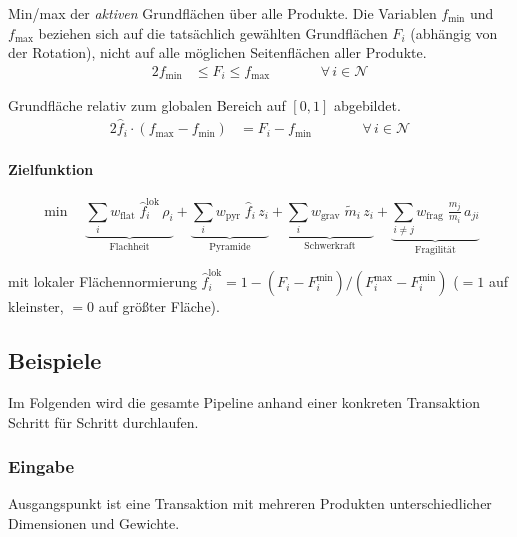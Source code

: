 \documentclass[10pt]{article}
\newcommand{\NN}{\mathcal{N}}
\begin{document}
Min/max der \emph{aktiven} Grundfl\"achen \"uber alle Produkte.
Die Variablen $f_{\min}$ und $f_{\max}$ beziehen sich auf die tats\"achlich
gew\"ahlten Grundfl\"achen $F_i$ (abh\"angig von der Rotation), nicht auf
alle m\"oglichen Seitenfl\"achen aller Produkte.
\begin{alignat*}{2}
f_{\min} &\leq F_i \leq f_{\max}
  &\qquad& \forall\, i \in \NN
\end{alignat*}

Grundfl\"ache relativ zum globalen Bereich auf $[0,1]$ abgebildet.
\begin{alignat*}{2}
\hat{f}_i \cdot (f_{\max} - f_{\min}) &= F_i - f_{\min}
  &\qquad& \forall\, i \in \NN
\end{alignat*}

\paragraph{Zielfunktion}

\begin{equation*}
\min \quad
  \underbrace{
    \sum_i w_{\mathrm{flat}}\; \hat{f}_i^{\mathrm{lok}}\, \rho_i
  }_{\text{Flachheit}}
  +
  \underbrace{
    \sum_i w_{\mathrm{pyr}}\; \hat{f}_i\, z_i
  }_{\text{Pyramide}}
  +
  \underbrace{
    \sum_i w_{\mathrm{grav}}\; \tilde{m}_i\, z_i
  }_{\text{Schwerkraft}}
  +
  \underbrace{
    \sum_{i \neq j}
    w_{\mathrm{frag}}\; \tfrac{m_j}{m_i}\, a_{ji}
  }_{\text{Fragilit\"at}}
\end{equation*}

mit lokaler Fl\"achennormierung
$\hat{f}_i^{\mathrm{lok}} = 1 - (F_i - F_i^{\min}) / (F_i^{\max} - F_i^{\min})$
\; ($= 1$ auf kleinster, $= 0$ auf gr\"o\ss ter Fl\"ache).

\subsection{Beispiele}

Im Folgenden wird die gesamte Pipeline anhand einer konkreten
Transaktion Schritt f\"ur Schritt durchlaufen.

\subsubsection{Eingabe}

Ausgangspunkt ist eine Transaktion mit mehreren Produkten
unterschiedlicher Dimensionen und Gewichte.
\end{document}
